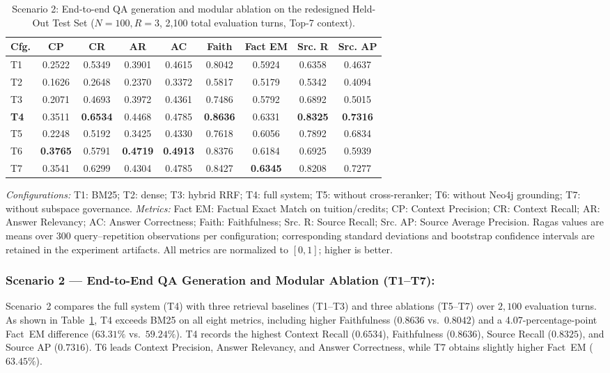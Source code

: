 \begin{table}[!htbp]
\centering
\caption{Scenario 2: End-to-end QA generation and modular ablation on the redesigned Held-Out Test Set ($N=100, R=3$, 2,100 total evaluation turns, Top-7 context).}
\label{tab:e2e_evaluation}
\small
\setlength{\tabcolsep}{2.4pt}
\begin{tabular}{lcccccccc}
\toprule
\textbf{Cfg.} & \textbf{CP} & \textbf{CR} & \textbf{AR} & \textbf{AC} & \textbf{Faith} & \textbf{Fact EM} & \textbf{Src. R} & \textbf{Src. AP} \\
\midrule
T1 & 0.2522 & 0.5349 & 0.3901 & 0.4615 & 0.8042 & 0.5924 & 0.6358 & 0.4637 \\
T2 & 0.1626 & 0.2648 & 0.2370 & 0.3372 & 0.5817 & 0.5179 & 0.5342 & 0.4094 \\
T3 & 0.2071 & 0.4693 & 0.3972 & 0.4361 & 0.7486 & 0.5792 & 0.6892 & 0.5015 \\
\textbf{T4} & 0.3511 & \textbf{0.6534} & 0.4468 & 0.4785 & \textbf{0.8636} & 0.6331 & \textbf{0.8325} & \textbf{0.7316} \\
T5 & 0.2248 & 0.5192 & 0.3425 & 0.4330 & 0.7618 & 0.6056 & 0.7892 & 0.6834 \\
T6 & \textbf{0.3765} & 0.5791 & \textbf{0.4719} & \textbf{0.4913} & 0.8376 & 0.6184 & 0.6925 & 0.5939 \\
T7 & 0.3541 & 0.6299 & 0.4304 & 0.4785 & 0.8427 & \textbf{0.6345} & 0.8208 & 0.7277 \\
\bottomrule
\end{tabular}
\medskip
\parbox{\columnwidth}{\footnotesize\emph{Configurations:} T1: BM25; T2: dense; T3: hybrid RRF; T4: full system; T5: without cross-reranker; T6: without Neo4j grounding; T7: without subspace governance. \emph{Metrics:} Fact EM: Factual Exact Match on tuition/credits; CP: Context Precision; CR: Context Recall; AR: Answer Relevancy; AC: Answer Correctness; Faith: Faithfulness; Src. R: Source Recall; Src. AP: Source Average Precision. Ragas values are means over 300 query--repetition observations per configuration; corresponding standard deviations and bootstrap confidence intervals are retained in the experiment artifacts. All metrics are normalized to $[0,1]$; higher is better.}
\end{table}

\subsubsection{Scenario 2 --- End-to-End QA Generation and Modular Ablation (T1--T7):}
Scenario~2 compares the full system (T4) with three retrieval baselines (T1--T3) and three ablations (T5--T7) over $2,100$ evaluation turns. As shown in Table~\ref{tab:e2e_evaluation}, T4 exceeds BM25 on all eight metrics, including higher Faithfulness ($0.8636$ vs.\ $0.8042$) and a 4.07-percentage-point Fact~EM difference ($63.31\%$ vs.\ $59.24\%$). T4 records the highest Context Recall ($0.6534$), Faithfulness ($0.8636$), Source Recall ($0.8325$), and Source AP ($0.7316$). T6 leads Context Precision, Answer Relevancy, and Answer Correctness, while T7 obtains slightly higher Fact~EM ($63.45\%$).
\FloatBarrier


